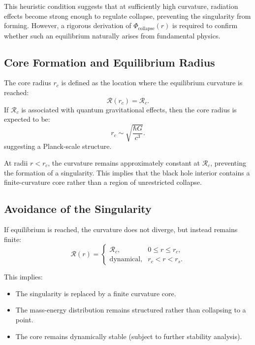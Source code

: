 This heuristic condition suggests that at sufficiently high curvature, radiation effects become strong enough to regulate collapse, preventing the singularity from forming. However, a rigorous derivation of \( \Phi_{\text{collapse}}(r) \) is required to confirm whether such an equilibrium naturally arises from fundamental physics.

\subsection{Core Formation and Equilibrium Radius}

The core radius \( r_c \) is defined as the location where the equilibrium curvature is reached:
\begin{equation}
    \mathcal{R}(r_c) = \mathcal{R}_c.
\end{equation}
If \( \mathcal{R}_c \) is associated with quantum gravitational effects, then the core radius is expected to be:
\begin{equation}
    r_c \sim \sqrt{\frac{\hbar G}{c^3}}.
\end{equation}
suggesting a Planck-scale structure.

At radii \( r < r_c \), the curvature remains approximately constant at \( \mathcal{R}_c \), preventing the formation of a singularity. This implies that the black hole interior contains a finite-curvature core rather than a region of unrestricted collapse.

\subsection{Avoidance of the Singularity}

If equilibrium is reached, the curvature does not diverge, but instead remains finite:
\begin{equation}
    \mathcal{R}(r) =
    \begin{cases}
        \mathcal{R}_c, & 0 \leq r \leq r_c, \\
        \text{dynamical}, & r_c < r < r_s.
    \end{cases}
\end{equation}

This implies:
\begin{itemize}
    \item The singularity is replaced by a finite curvature core.
    \item The mass-energy distribution remains structured rather than collapsing to a point.
    \item The core remains dynamically stable (subject to further stability analysis).
\end{itemize}

